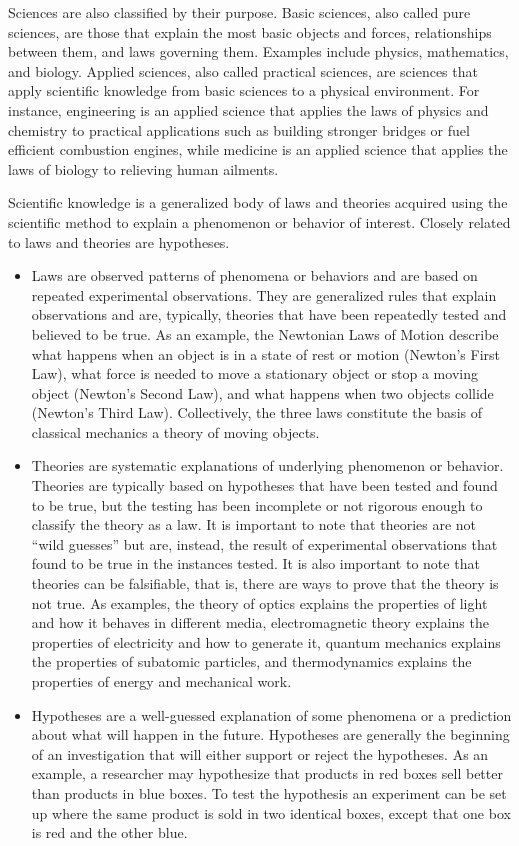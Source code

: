 Sciences are also classified by their purpose. Basic sciences, also called pure sciences, are those that explain the most basic objects and forces, relationships between them, and laws governing them. Examples include physics, mathematics, and biology. Applied sciences, also called practical sciences, are sciences that apply scientific knowledge from basic sciences to a physical environment. For instance, engineering is an applied science that applies the laws of physics and chemistry to practical applications such as building stronger bridges or fuel efficient combustion engines, while medicine is an applied science that applies the laws of biology to relieving human ailments.

Scientific knowledge is a generalized body of laws and theories acquired using the scientific method to explain a phenomenon or behavior of interest. Closely related to laws and theories are hypotheses.

\begin{itemize}
	\item Laws are observed patterns of phenomena or behaviors and are based on repeated experimental observations. They are generalized rules that explain observations and are, typically, theories that have been repeatedly tested and believed to be true. As an example, the Newtonian Laws of Motion describe what happens when an object is in a state of rest or motion (Newton's First Law), what force is needed to move a stationary object or stop a moving object (Newton's Second Law), and what happens when two objects collide (Newton's Third Law). Collectively, the three laws constitute the basis of classical mechanics \textemdash \; a theory of moving objects. 
	\item Theories are systematic explanations of underlying phenomenon or behavior. Theories are typically based on hypotheses that have been tested and found to be true, but the testing has been incomplete or not rigorous enough to classify the theory as a law. It is important to note that theories are not ``wild guesses'' but are, instead, the result of experimental observations that found to be true in the instances tested. It is also important to note that theories can be falsifiable, that is, there are ways to prove that the theory is not true. As examples, the theory of optics explains the properties of light and how it behaves in different media, electromagnetic theory explains the properties of electricity and how to generate it, quantum mechanics explains the properties of subatomic particles, and thermodynamics explains the properties of energy and mechanical work. 
	\item Hypotheses are a well-guessed explanation of some phenomena or a prediction about what will happen in the future. Hypotheses are generally the beginning of an investigation that will either support or reject the hypotheses. As an example, a researcher may hypothesize that products in red boxes sell better than products in blue boxes. To test the hypothesis an experiment can be set up where the same product is sold in two identical boxes, except that one box is red and the other blue.
\end{itemize}


